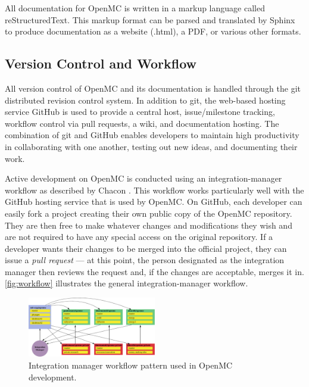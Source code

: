 \documentclass[5p,authoryear]{elsarticle}
\begin{document}
All documentation for OpenMC is written in a markup language called
reStructuredText. This markup format can be parsed and translated by Sphinx
\citep{sphinx-2013} to produce documentation as a website (.html), a PDF, or
various other formats.

\subsection{Version Control and Workflow}

All version control of OpenMC and its documentation is handled through the git
distributed revision control system. In addition to git, the web-based hosting
service GitHub is used to provide a central host, issue/milestone tracking,
workflow control via pull requests, a wiki, and documentation hosting. The
combination of git and GitHub enables developers to maintain high productivity
in collaborating with one another, testing out new ideas, and documenting their
work.

Active development on OpenMC is conducted using an integration-manager workflow
as described by Chacon \citep{chacon-2009}. This workflow works particularly
well with the GitHub hosting service that is used by OpenMC. On GitHub, each
developer can easily fork a project creating their own public copy of the OpenMC
repository. They are then free to make whatever changes and modifications they
wish and are not required to have any special access on the original
repository. If a developer wants their changes to be merged into the official
project, they can issue a \emph{pull request} --- at this point, the person
designated as the integration manager then reviews the request and, if the
changes are acceptable, merges it in. \autoref{fig:workflow} illustrates the
general integration-manager workflow.
\begin{figure}[htb]
  \centering
  \includegraphics[width=0.5\textwidth]{images/integration-manager.pdf}
  \caption{Integration manager workflow pattern used in OpenMC development.}
  \label{fig:workflow}
\end{figure}

\end{document}
